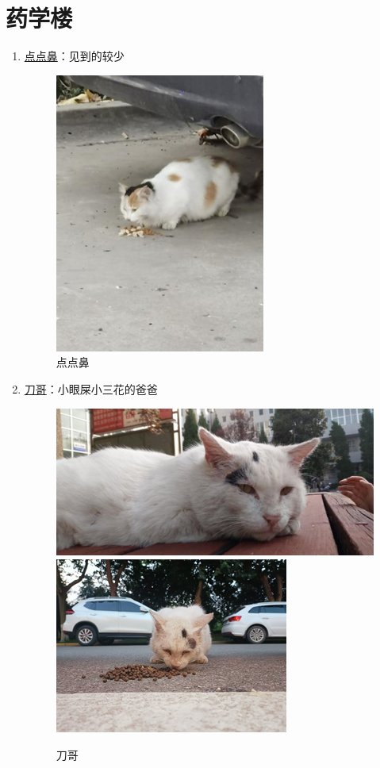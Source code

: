 \documentclass[zihao=-4,fontset=none]{Beautybook-CN}
\begin{document}
\section{药学楼}
\begin{enumerate}
    \item \hyperref[img48]{点点鼻}：见到的较少
    \begin{figure}[htbp]
            \centering
            \includegraphics[width=0.4\linewidth]{media/cimage48.png}
            \caption{点点鼻}
            \label{img48}
    \end{figure}
        \item \hyperref[img4950]{刀哥}：小眼屎小三花的爸爸
    \begin{figure}[htbp]
            \centering
            \includegraphics[width=0.4\linewidth]{media/cimage49.png}
        \qquad
            \includegraphics[width=0.4\linewidth]{media/cimage50.png}
            \caption{刀哥}
            \label{img4950}
    \end{figure}
    \end{enumerate}
\end{document}
